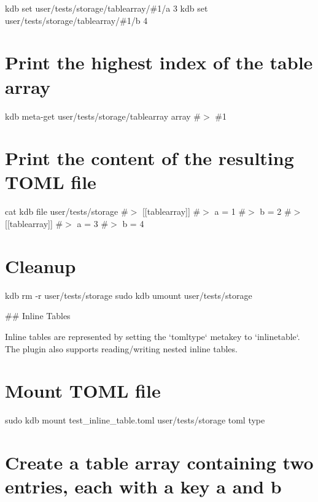 kdb set \textquotesingle{}user/tests/storage/tablearray/\#1/a\textquotesingle{} \textquotesingle{}3\textquotesingle{} kdb set \textquotesingle{}user/tests/storage/tablearray/\#1/b\textquotesingle{} \textquotesingle{}4\textquotesingle{}\hypertarget{autotoc_md693_autotoc_md766}{}\section{Print the highest index of the table array}\label{autotoc_md693_autotoc_md766}
kdb meta-\/get \textquotesingle{}user/tests/storage/tablearray\textquotesingle{} \textquotesingle{}array\textquotesingle{} \#$>$ \#1\hypertarget{autotoc_md693_autotoc_md767}{}\section{Print the content of the resulting T\+O\+M\+L file}\label{autotoc_md693_autotoc_md767}
cat {\ttfamily kdb file user/tests/storage} \#$>$ \mbox{[}\mbox{[}tablearray\mbox{]}\mbox{]} \#$>$ a = 1 \#$>$ b = 2 \#$>$ \mbox{[}\mbox{[}tablearray\mbox{]}\mbox{]} \#$>$ a = 3 \#$>$ b = 4\hypertarget{autotoc_md693_autotoc_md768}{}\section{Cleanup}\label{autotoc_md693_autotoc_md768}
kdb rm -\/r user/tests/storage sudo kdb umount user/tests/storage 
\begin{DoxyCode}
## Inline Tables

Inline tables are represented by setting the `tomltype` metakey to `inlinetable`. The plugin also supports
       reading/writing nested inline tables.
\end{DoxyCode}
 \hypertarget{autotoc_md693_autotoc_md769}{}\section{Mount T\+O\+M\+L file}\label{autotoc_md693_autotoc_md769}
sudo kdb mount test\+\_\+inline\+\_\+table.\+toml user/tests/storage toml type\hypertarget{autotoc_md693_autotoc_md770}{}\section{Create a table array containing two entries, each with a key \textquotesingle{}a\textquotesingle{} and \textquotesingle{}b\textquotesingle{}}\label{autotoc_md693_autotoc_md770}
